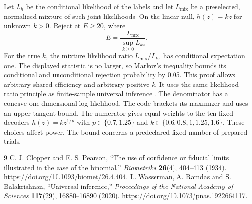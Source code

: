 \documentclass[10pt,a4paper]{article}
\begin{document}
Let $L_h$ be the conditional likelihood of the labels and let $L_{\mathrm{mix}}$ be a preselected, normalized mixture of such joint likelihoods. On the linear null, $h(z)=kz$ for unknown $k>0$. Reject at $E\ge20$, where
\[
 E=\frac{L_{\mathrm{mix}}}{\sup_{k\ge0}L_{kz}}.
\]
For the true $k$, the mixture likelihood ratio $L_{\mathrm{mix}}/L_{kz}$ has conditional expectation one. The displayed statistic is no larger, so Markov's inequality bounds its conditional and unconditional rejection probability by 0.05. This proof allows arbitrary shared efficiency and arbitrary positive $k$. It uses the same likelihood-ratio principle as finite-sample universal inference \cite{universal}. The denominator has a concave one-dimensional log likelihood. The code brackets its maximizer and uses an upper tangent bound. The numerator gives equal weights to the ten fixed decoders $h(z)=kz^{1/p}$ with $p\in\{0.7,1.25\}$ and $k\in\{0.6,0.8,1,1.25,1.6\}$. These choices affect power. The bound concerns a predeclared fixed number of prepared trials.


\begin{thebibliography}{9}
 C. J. Clopper and E. S. Pearson, ``The use of confidence or fiducial limits illustrated in the case of the binomial,'' \emph{Biometrika} \textbf{26}(4), 404--413 (1934). \url{https://doi.org/10.1093/biomet/26.4.404}.
 L. Wasserman, A. Ramdas and S. Balakrishnan, ``Universal inference,'' \emph{Proceedings of the National Academy of Sciences} \textbf{117}(29), 16880--16890 (2020). \url{https://doi.org/10.1073/pnas.1922664117}.
\end{thebibliography}
\end{document}
